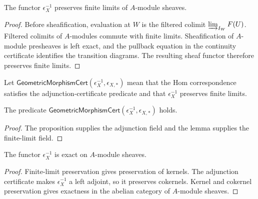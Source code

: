 \begin{lemma}
\label{lemma:weil-efi-site-inverse-image-finite-limits}
The functor $\epsilon_X^{-1}$ preserves finite limits of $A$-module sheaves.
\end{lemma}
\begin{proof}
Before sheafification, evaluation at $W$ is the filtered colimit
$\varinjlim_{I_W}F(U)$.  Filtered colimits of $A$-modules commute with finite
limits.  Sheafification of $A$-module presheaves is left exact, and the
pullback equation in the continuity certificate identifies the transition
diagrams.  The resulting sheaf functor therefore preserves finite limits.
\end{proof}

\begin{definition}
\label{def:weil-efi-site-geometric-morphism-certificate}
Let $\mathsf{GeometricMorphismCert}(\epsilon_X^{-1},\epsilon_{X,*})$ mean
that the Hom correspondence satisfies the adjunction-certificate predicate
and that $\epsilon_X^{-1}$ preserves finite limits.
\end{definition}

\begin{proposition}
\label{prop:weil-efi-site-geometric-morphism-package}
The predicate
$\mathsf{GeometricMorphismCert}(\epsilon_X^{-1},\epsilon_{X,*})$ holds.
\end{proposition}
\begin{proof}
The proposition supplies the adjunction field and the lemma supplies the
finite-limit field.
\end{proof}

\begin{lemma}
\label{lemma:weil-efi-site-inverse-image-exact}
The functor $\epsilon_X^{-1}$ is exact on $A$-module sheaves.
\end{lemma}
\begin{proof}
Finite-limit preservation gives preservation of kernels.  The adjunction
certificate makes $\epsilon_X^{-1}$ a left adjoint, so it preserves
cokernels.  Kernel and cokernel preservation gives exactness in the abelian
category of $A$-module sheaves.
\end{proof}

